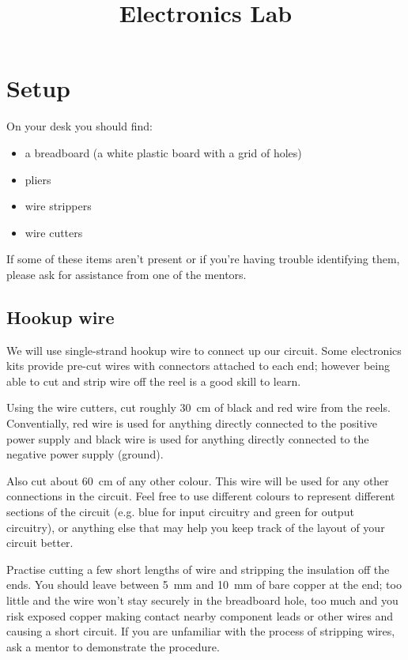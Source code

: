 \documentclass{article}
\title{Electronics Lab}
\begin{document}
\listoftodos
\newpage

\maketitle


\section{Setup}

On your desk you should find:

\begin{itemize}
\item a breadboard (a white plastic board with a grid of holes)
\item pliers
\item wire strippers
\item wire cutters
\end{itemize}

If some of these items aren't present or if you're having trouble identifying
them, please ask for assistance from one of the mentors.

\subsection{Hookup wire}

We will use single-strand hookup wire to connect up our circuit. Some
electronics kits provide pre-cut wires with connectors attached to each end;
however being able to cut and strip wire off the reel is a good skill to learn.

Using the wire cutters, cut roughly \SI{30}{\centi\metre} of black and red wire
from the reels. Conventially, red wire is used for anything directly connected
to the positive power supply and black wire is used for anything directly
connected to the negative power supply (ground).

Also cut about \SI{60}{\centi\metre} of any other colour. This wire will be used
for any other connections in the circuit. Feel free to use different colours to
represent different sections of the circuit (e.g. blue for input circuitry and
green for output circuitry), or anything else that may help you keep track of
the layout of your circuit better.

Practise cutting a few short lengths of wire and stripping the insulation off
the ends. You should leave between \SI{5}{\milli\metre} and
\SI{10}{\milli\metre} of bare copper at the end; too little and the wire won't
stay securely in the breadboard hole, too much and you risk exposed copper
making contact nearby component leads or other wires and causing a short
circuit. If you are unfamiliar with the process of stripping wires, ask a
mentor to demonstrate the procedure.
\end{document}
